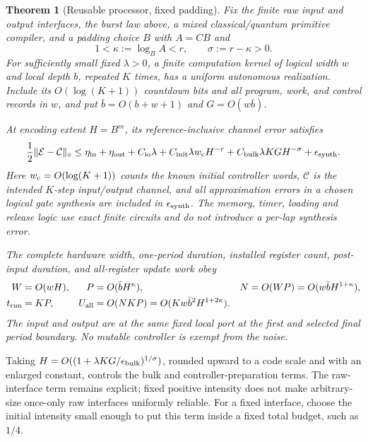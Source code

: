 \documentclass[11pt]{article}
\newtheorem{theorem}{Theorem}
\begin{document}
\begin{theorem}[Reusable processor, fixed padding]\label{thm:reuse}
Fix the finite raw input and output interfaces, the burst law above, a
mixed classical/quantum primitive compiler, and a padding choice
$B$ with $A=CB$ and
\[
 1<\kappa:=\log_B A<r,\qquad
 \sigma:=r-\kappa>0.
\]
For sufficiently small fixed $\lambda>0$, a finite computation kernel of
logical width $w$ and local depth $b$, repeated $K$ times, has a uniform
autonomous realization. Include its $O(\log(K+1))$ countdown bits and all
program, work, and control records in $w$, and put
$\bar b=O(b+w+1)$ and $G=O(w\bar b)$.

At encoding extent $H=B^m$, its reference-inclusive channel error satisfies
\begin{equation}\label{eq:generalerror}
 \frac12\|\mathcal E-\mathcal C\|_\diamond
 \leq \eta_{\rm in}+\eta_{\rm out}
     + C_{\rm io}\lambda
     + C_{\rm init}\lambda w_{\rm c}H^{-r}
     + C_{\rm bulk}\lambda KG H^{-\sigma}
     +\epsilon_{\rm synth}.
\end{equation}
Here $w_{\rm c}=O(\log(K+1))$ counts the known initial controller words,
$\mathcal C$ is the intended $K$-step input/output channel, and all
approximation errors in a chosen logical gate synthesis are included in
$\epsilon_{\rm synth}$. The memory, timer, loading and release logic use
exact finite circuits and do not introduce a per-lap synthesis error.

The complete hardware width, one-period duration, installed register count,
post-input duration, and all-register update work obey
\begin{align}
 W&=O(wH),&
 P&=O(\bar bH^\kappa),&
 N&=O(WP)=O(w\bar bH^{1+\kappa}),\label{eq:res1}\\
 t_{\rm run}&=KP,&
 U_{\rm all}&=O(NKP)
   =O(Kw\bar b^2H^{1+2\kappa}).\label{eq:res2}
\end{align}
The input and output are at the same fixed local port at the first and
selected final period boundary. No mutable controller is exempt from the
noise.
\end{theorem}

Taking
$H=O((1+\lambda KG/\epsilon_{\rm bulk})^{1/\sigma})$, rounded upward to
a code scale and with an enlarged constant, controls the bulk and
controller-preparation terms. The raw-interface term remains explicit;
fixed positive intensity does not make arbitrary-size once-only raw
interfaces uniformly reliable. For a fixed interface, choose the initial
intensity small enough to put this term inside a fixed total budget, such
as $1/4$.
\end{document}
